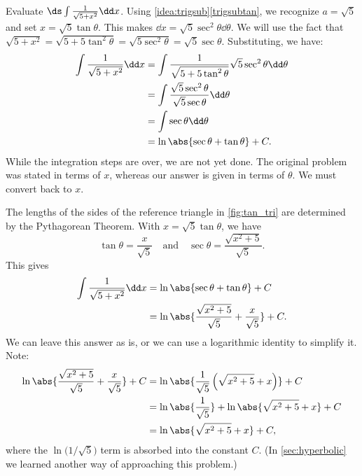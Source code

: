 \begin{example}\label{ex_trigsub3}%
Evaluate $\ds \int \frac{1}{\sqrt{5+x^2}}\dd x$.
\solution
Using \autoref{idea:trigsub}\ref*{trigsubtan}, we recognize $a=\sqrt{5}$ and  set $x= \sqrt{5}\tan \theta$. This makes $\dd x = \sqrt{5}\sec^2\theta\dd\theta$. We will use the fact that $\sqrt{5+x^2} = \sqrt{5+5\tan^2\theta} = \sqrt{5\sec^2\theta} = \sqrt{5}\sec\theta.$ Substituting, we have:
\begin{align*}
\int \frac{1}{\sqrt{5+x^2}}\dd x &= \int \frac{1}{\sqrt{5+5\tan^2\theta}}\sqrt{5}\sec^2\theta\dd\theta \\
			&= \int \frac{\sqrt{5}\sec^2\theta}{\sqrt{5}\sec\theta} \dd\theta\\
			&= \int \sec\theta\dd\theta\\
			&= \ln\abs{\sec\theta+\tan\theta}+C.
\end{align*}
While the integration steps are over, we are not yet done. The original problem was stated in terms of $x$, whereas our answer is given in terms of $\theta$. We must convert back to $x$.

The lengths of the sides of the reference triangle in \autoref{fig:tan_tri} are determined by the Pythagorean Theorem. With $x=\sqrt{5}\tan\theta$, we have 
\[\tan \theta = \frac x{\sqrt{5}}\quad \text{and}\quad \sec\theta = \frac{\sqrt{x^2+5}}{\sqrt{5}}.\]
This gives\vspace{-.3\baselineskip}
\begin{align*}
	\int\frac1{\sqrt{5+x^2}}\dd x
	&= \ln\abs{\sec\theta+\tan\theta}+C \\
	&= \ln\abs{\frac{\sqrt{x^2+5}}{\sqrt5}+ \frac x{\sqrt5}}+C.
\end{align*}
We can leave this answer as is, or we can use a logarithmic identity to simplify it. Note:\vspace{-.3\baselineskip}
\begin{align*}
	\ln\abs{\frac{\sqrt{x^2+5}}{\sqrt5}+ \frac x{\sqrt5}}+C
	&= \ln\abs{\frac1{\sqrt5}\left(\sqrt{x^2+5}+ x\right)}+C \\
	&= \ln\abs{\frac1{\sqrt5}} + \ln\abs{\sqrt{x^2+5}+ x}+C\\
	&=	\ln\abs{\sqrt{x^2+5}+ x}+C,
\end{align*}
where the $\ln\bigl(1/\sqrt5\bigr)$ term is absorbed into the constant $C$. (In \autoref{sec:hyperbolic} we learned another way of approaching this problem.)
\end{example}

